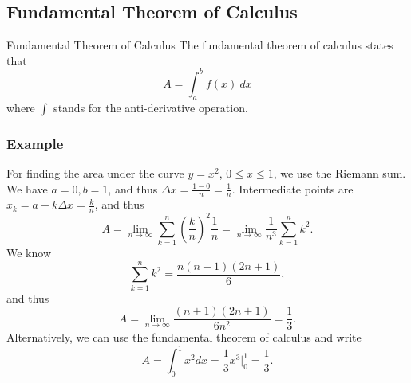 \documentclass[letterpaper,10pt,twoside,twocolumn,openany]{book}
\begin{document}
\subsection{Fundamental Theorem of Calculus}
\begin{DndSidebar}{Fundamental Theorem of Calculus}
    The fundamental theorem of calculus states that
    \[ A = \int_a^b f(x)\ dx \]
    where $\int$ stands for the anti-derivative operation.
\end{DndSidebar}
\subsubsection*{Example}
For finding the area under the curve $y = x^2$, $0 \leq x \leq 1$, we use the Riemann sum. We have $a = 0, b = 1$, and thus $\Delta x = \frac{1 - 0}{n} = \frac{1}{n}$. 
Intermediate points are $x_k = a + k \Delta x = \frac{k}{n}$, and thus
\[ A = \lim_{n \rightarrow \infty} \sum_{k = 1}^n \left( \frac{k}{n} \right)^2 \frac{1}{n} = \lim_{n \rightarrow \infty} \frac{1}{n^3} \sum_{k = 1}^n k^2 . \]
We know
\[ \sum_{k = 1}^n k^2 = \frac{n ( n + 1) ( 2 n + 1)}{6}, \]
and thus
\[ A = \lim_{n \rightarrow \infty} \frac{( n + 1) ( 2 n + 1)}{6 n^2} =
   \frac{1}{3} . \]
Alternatively, we can use the fundamental theorem of calculus and write
\[ A = \int_0^1 x^2 dx = \frac{1}{3} x^3 |_0^1 = \frac{1}{3} . \]
\end{document}
